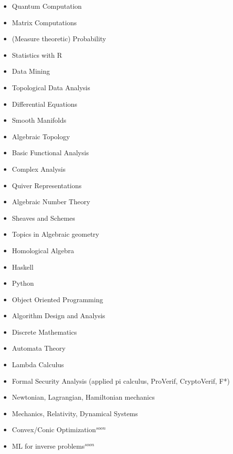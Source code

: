 \begin{multicols}{3}
\begin{itemize}
\setlength\itemsep{-0.5em}
\item Quantum Computation
\item Matrix Computations
\item (Measure theoretic) Probability
\item Statistics with R
\item Data Mining
\item Topological Data Analysis
\item Differential Equations
\item Smooth Manifolds
\item Algebraic Topology
\item Basic Functional Analysis
\item Complex Analysis
\item Quiver Representations
\item Algebraic Number Theory
\item Sheaves and Schemes
\item Topics in Algebraic geometry
\item Homological Algebra
\item Haskell
\item Python
\item Object Oriented Programming
\item Algorithm Design and Analysis
\item Discrete Mathematics
\item Automata Theory
\item Lambda Calculus
\item Formal Security Analysis (applied pi calculus, ProVerif, CryptoVerif, F*)
\item Newtonian, Lagrangian, Hamiltonian mechanics
\item Mechanics, Relativity, Dynamical Systems
\item Convex/Conic Optimization$^{soon}$
\item ML for inverse problems$^{soon}$
\end{itemize}
\end{multicols}





